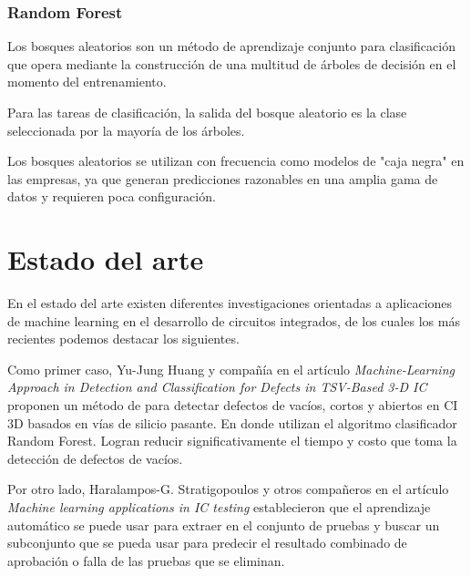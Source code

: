 \subsubsection{ Random Forest} \par

Los bosques aleatorios son un método de aprendizaje conjunto para clasificación que opera mediante la construcción de una multitud de árboles de decisión en el momento del entrenamiento.\par

Para las tareas de clasificación, la salida del bosque aleatorio es la clase seleccionada por la mayoría de los árboles.\par

Los bosques aleatorios se utilizan con frecuencia como modelos de "caja negra" en las empresas, ya que generan predicciones razonables en una amplia gama de datos y requieren poca configuración. \par


\section{Estado del arte}

En el estado del arte existen diferentes investigaciones orientadas a aplicaciones de machine learning en el desarrollo de circuitos integrados, de los cuales los más recientes podemos destacar los siguientes. \par



Como primer caso, Yu-Jung Huang y compañía en el artículo \textit{Machine-Learning Approach in Detection and Classification for Defects in TSV-Based 3-D IC} proponen un método de para detectar defectos de vacíos, cortos y abiertos en CI  3D basados en vías de silicio pasante. En donde utilizan el algoritmo clasificador Random Forest. Logran reducir significativamente el tiempo y costo que toma la detección de defectos de vacíos.\par

Por otro lado, Haralampos-G. Stratigopoulos y otros compañeros en el artículo \textit{Machine learning applications in IC testing} establecieron que el aprendizaje automático se puede usar para extraer en el conjunto de pruebas y buscar un subconjunto que se pueda usar para predecir el resultado combinado de aprobación o falla de las pruebas que se eliminan.\par

